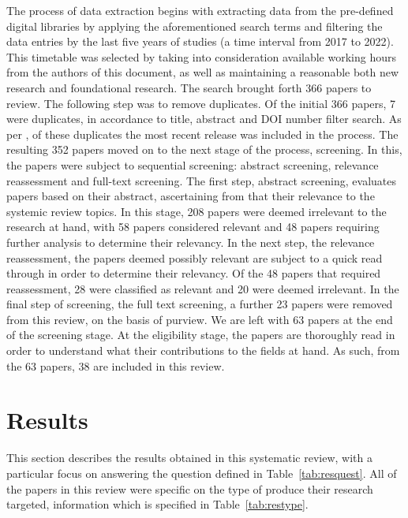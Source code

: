 \documentclass[conference]{IEEEtran}
\begin{document}
The process of data extraction begins with extracting data from the pre-defined digital libraries by applying the aforementioned search terms and filtering the data entries by the last five years of studies (a time interval from 2017 to 2022). This timetable was selected by taking into consideration available working hours from the authors of this document, as well as maintaining a reasonable both new research and foundational research. The search brought forth 366 papers to review.
The following step was to remove duplicates. Of the initial 366 papers, 7 were duplicates, in accordance to title, abstract and DOI number filter search. As per , of these duplicates the most recent release was included in the process.
The resulting 352 papers moved on to the next stage of the process, screening. In this, the papers were subject to sequential screening: abstract screening, relevance reassessment and full-text screening.
The first step, abstract screening, evaluates papers based on their abstract, ascertaining from that their relevance to the systemic review topics. In this stage, 208 papers were deemed irrelevant to the research at hand, with 58 papers considered relevant and 48 papers requiring further analysis to determine their relevancy.
In the next step, the relevance reassessment, the papers deemed possibly relevant are subject to a quick read through in order to determine their relevancy. Of the 48 papers that required reassessment, 28 were classified as relevant and 20 were deemed irrelevant.
In the final step of screening, the full text screening, a further 23 papers were removed from this review, on the basis of purview. We are left with 63 papers at the end of the screening stage.
At the eligibility stage, the papers are thoroughly read in order to understand what their contributions to the fields at hand. As such, from the 63 papers, 38 are included in this review.

\section{Results}
\label{sec:res}

This section describes the results obtained in this systematic review, with a particular focus on answering the question defined in Table~\ref{tab:resquest}. All of the papers in this review were specific on the type of produce their research targeted, information which is specified in Table~\ref{tab:restype}.
\end{document}
